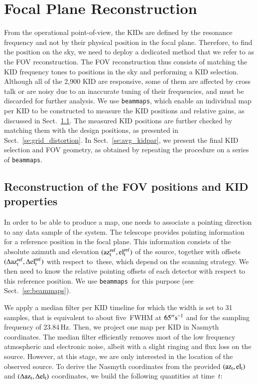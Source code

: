 \documentclass[traditionalabstract]{aa}
\newcommand{\elev}{\rm{el}}
\newcommand{\az}{\rm{az}}
\newcommand{\bms}{{\tt beammaps}}
\newcommand{\lp}[1]{#1}
\begin{document}
{\section{Focal Plane Reconstruction}
\label{se:geometry}
%

{\lp From the operational point-of-view, the KIDs are defined by the
resonance frequency and not by their physical position in the focal
plane. Therefore, to find the position on the sky, we need to deploy
a dedicated method that we refer to as the FOV reconstruction.}
The FOV reconstruction thus consists of matching the KID frequency tones
to positions in the sky and performing a KID selection.
Although all of the 2,900 KID are responsive, some of them are affected by
cross talk or are noisy due to an inaccurate tuning of their
frequencies, and must be discarded for further analysis. We use \bms,
which enable an individual map per KID to be constructed %
to measure the KID positions and relative gains, as
discussed in Sect.~\ref{se:fov_geometry}. The measured KID positions
are further
checked by matching them with the design positions, as presented in
Sect.~\ref{se:grid_distortion}. In Sect.~\ref{se:avg_kidpar}, we
present the final KID selection and FOV geometry, as obtained by
repeating the procedure on a series of \bms.  



\subsection{Reconstruction of the FOV positions and KID properties}
\label{se:fov_geometry}

In order to be able to produce a map, one needs to associate a pointing
direction to any data sample of the system. The telescope provides
pointing information for a reference position in the focal
plane. This information consists of the
absolute azimuth and elevation $(\az_t^{\rm{ref}},\elev_t^{\rm{ref}})$
of the source, together with offsets
$(\Delta\az_t^{\rm{ref}}, \Delta\elev_t^{\rm{ref}})$ with respect to~these{\lp, which 
depend on the scanning strategy.}
We then need to know the relative pointing offsets of each detector
with respect to this reference position. We use
\bms\ for this purpose (see Sect.~\ref{se:beammaps}).

We apply a median filter per KID timeline for which the width is set to 31
samples, that is equivalent to about five~FWHM at $65''\rm{s}^{-1}$ and for the
sampling frequency of
23.84\,Hz. Then, we project one map per KID in Nasmyth
coordinates. The median filter efficiently removes most of the low frequency atmospheric and electronic
noise, albeit with a slight ringing and flux loss on the
source. However, at this stage, we are only interested in the location
of the observed source.
To derive the Nasmyth coordinates from the
provided $(\az_t,\elev_t)$ and $(\Delta\az_t,\Delta\elev_t)$
coordinates, we build the following quantities at time~$t$:

}
\end{document}
